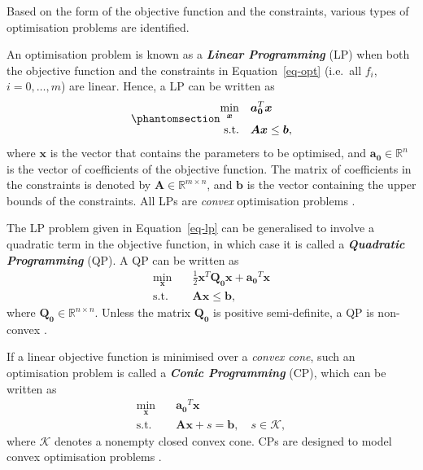 \documentclass[
  11pt,
  a4paper,
]{article}
\begin{document}
Based on the form of the objective function and the constraints, various
types of optimisation problems are identified.

An optimisation problem is known as a \textbf{\emph{Linear Programming}}
(LP) when both the objective function and the constraints in
Equation~\ref{eq-opt} (i.e.~all \(f_{i}\), \(i = 0, \dots, m\)) are
linear. Hence, a LP can be written as
\begin{equation}\phantomsection\label{eq-lp}{
\begin{aligned}
  \min_{\bm{x}} \quad & \bm{a_{0}}^{T}\bm{x}\\
  \text{s.t.} \quad & \bm{A}\bm{x} \le \bm{b},
\end{aligned}
}\end{equation} where \(\bm{x}\) is the vector that contains the
parameters to be optimised, and \(\bm{a_{0}} \in \mathbb{R}^{n}\) is the
vector of coefficients of the objective function. The matrix of
coefficients in the constraints is denoted by
\(\bm{A} \in \mathbb{R}^{m \times n}\), and \(\bm{b}\) is the vector
containing the upper bounds of the constraints. All LPs are
\emph{convex} optimisation problems \autocite{Theusl2020}.

The LP problem given in Equation~\ref{eq-lp} can be generalised to
involve a quadratic term in the objective function, in which case it is
called a \textbf{\emph{Quadratic Programming}} (QP). A QP can be written
as \[
\begin{aligned}
  \min_{\bm{x}} \quad & \frac{1}{2} \bm{x}^{T} \bm{Q_{0}} \bm{x} + \bm{a_{0}}^{T}\bm{x}\\
  \text{s.t.} \quad & \bm{A}\bm{x} \le \bm{b},
\end{aligned}
\] where \(\bm{Q_{0}} \in \mathbb{R}^{n \times n}\). Unless the matrix
\(\bm{Q_{0}}\) is positive semi-definite, a QP is non-convex
\autocite{Theusl2020}.

If a linear objective function is minimised over a \emph{convex cone},
such an optimisation problem is called a \textbf{\emph{Conic
Programming}} (CP), which can be written as \[
\begin{aligned}
  \min_{\bm{x}} \quad & \bm{a_{0}}^{T}\bm{x} \\
  \text{s.t.} \quad & \bm{A}\bm{x} + s = \bm{b}, \quad s \in \mathcal{K},
\end{aligned}
\] where \(\mathcal{K}\) denotes a nonempty closed convex cone. CPs are
designed to model convex optimisation problems \autocite{Theusl2020}.
\end{document}
